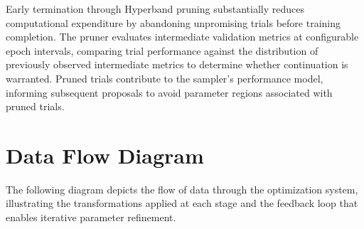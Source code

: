 Early termination through Hyperband pruning substantially reduces computational expenditure by abandoning unpromising trials before training completion. The pruner evaluates intermediate validation metrics at configurable epoch intervals, comparing trial performance against the distribution of previously observed intermediate metrics to determine whether continuation is warranted. Pruned trials contribute to the sampler's performance model, informing subsequent proposals to avoid parameter regions associated with pruned trials.

\section{Data Flow Diagram}
\label{sec:data_flow_diagram}

The following diagram depicts the flow of data through the optimization system, illustrating the transformations applied at each stage and the feedback loop that enables iterative parameter refinement.

